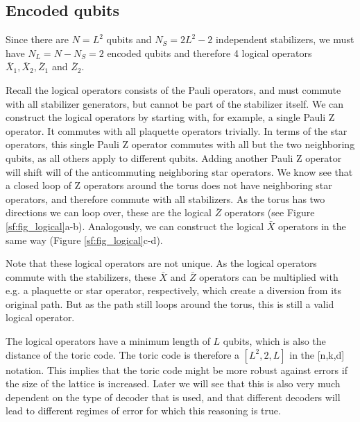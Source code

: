 \subsection{Encoded qubits}
Since there are $N = L^2$ qubits and $N_S = 2L^2 - 2$ independent stabilizers, we must have $N_L = N - N_S = 2$ encoded qubits and therefore 4 logical operators $\bar{X}_1, \bar{X}_2, \bar{Z}_1$ and $\bar{Z}_2$.

Recall the logical operators consists of the Pauli operators, and must commute with all stabilizer generators, but cannot be part of the stabilizer itself. We can construct the logical operators by starting with, for example, a single Pauli Z operator. It commutes with all plaquette operators trivially. In terms of the star operators, this single Pauli Z operator commutes with all but the two neighboring qubits, as all others apply to different qubits. Adding another Pauli Z operator will shift will of the anticommuting neighboring star operators. We know see that a closed loop of Z operators around the torus does not have neighboring star operators, and therefore commute with all stabilizers. As the torus has two directions we can loop over, these are the logical $\bar{Z}$ operators (see Figure \ref{sf:fig_logical}a-b). Analogously, we can construct the logical $\bar{X}$ operators in the same way (Figure \ref{sf:fig_logical}c-d).

Note that these logical operators are not unique. As the logical operators commute with the stabilizers, these $\bar{X}$ and $\bar{Z}$ operators can be multiplied with e.g. a plaquette or star operator, respectively, which create a diversion from its original path. But as the path still loops around the torus, this is still a valid logical operator.

The logical operators have a minimum length of $L$ qubits, which is also the distance of the toric code. The toric code is therefore a $[L^2,2,L]$ in the [n,k,d] notation. This implies that the toric code might be more robust against errors if the size of the lattice is increased. Later we will see that this is also very much dependent on the type of decoder that is used, and that different decoders will lead to different regimes of error for which this reasoning is true.

\def\QS{10}
\def\s{1}


